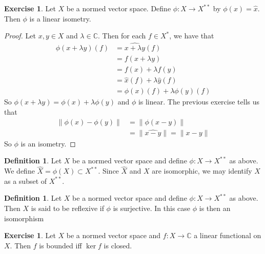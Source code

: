 \documentclass[12pt]{amsart}
\theoremstyle{definition}
\newtheorem{defn}[definition]{Definition}
\newtheorem{ex}[definition]{Exercise}
\newcommand{\lam}{\lambda}
\newcommand{\C}{\mathbb{C}}
\begin{document}
	
	\begin{ex}
		Let $X$ be a normed vector space. Define $\phi : X \rightarrow X^{**}$ by $\phi(x) = \hat{x}$. Then $\phi$ is a linear isometry. 
	\end{ex}
	
	\begin{proof}
		Let $x,y \in X$ and $\lam \in \C$. Then for each $f \in X^*$, we have that 
		\begin{align*}
			\phi(x+ \lam y)(f) 
			&= \widehat{x+ \lam y}(f) \\
			&= f(x+\lam y) \\
			&= f(x) + \lam f(y) \\
			&= \hat{x}(f) + \lam \hat{y}(f)\\
			&= \phi(x)(f) + \lam \phi(y)(f)
		\end{align*} 
		So $\phi(x+ \lam y) = \phi(x) + \lam \phi(y)$ and $\phi$ is linear. The previous exercise tells us that 
		\begin{align*}
			\|\phi(x) - \phi(y) \|
			&= \|\phi(x-y)\|\\
			&= \|\widehat{x-y} \|= \|x-y \|
		\end{align*}
		So $\phi$ is an isometry.
	\end{proof}
	
	\begin{defn}
		Let $X$ be a normed vector space and define $\phi:X \rightarrow X^{**}$ as above. We define $\widehat{X} = \phi(X) \subset X^{**}$. Since $\widehat{X}$ and $X$ are isomorphic, we may identify $X$ as a subset of $X^{**}$. 
	\end{defn}
	
	\begin{defn}
		Let $X$ be a normed vector space and define $\phi:X \rightarrow X^{**}$ as above. Then $X$ is said to be reflexive if $\phi$ is surjective. In this case $\phi$ is then an isomorphism
	\end{defn}
	
	\begin{ex}
		Let $X$ be a normed vector space and $f:X \rightarrow \C$ a linear functional on $X$. Then $f$ is bounded iff $\ker f$ is closed. 
	\end{ex}
	
\end{document}
